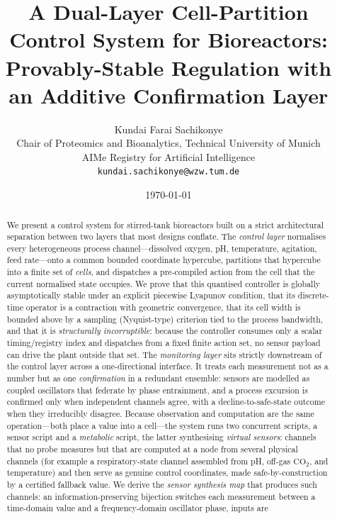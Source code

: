 \documentclass[11pt,a4paper,twocolumn]{article}
\title{\textbf{A Dual-Layer Cell-Partition Control System for
Bioreactors:\\[2pt] Provably-Stable Regulation with an Additive
Confirmation Layer}}
\author{%
Kundai Farai Sachikonye\\
\small Chair of Proteomics and Bioanalytics, Technical University of Munich\\
\small AIMe Registry for Artificial Intelligence\\
\small \texttt{kundai.sachikonye@wzw.tum.de}}
\date{\today}
\theoremstyle{thmstyle}
\theoremstyle{definition}
\theoremstyle{remark}
\begin{document}
\maketitle

\begin{abstract}
\noindent
We present a control system for stirred-tank bioreactors built on a
strict architectural separation between two layers that most designs
conflate. The \emph{control layer} normalises every heterogeneous
process channel---dissolved oxygen, pH, temperature, agitation, feed
rate---onto a common bounded coordinate hypercube, partitions that
hypercube into a finite set of \emph{cells}, and dispatches a
pre-compiled action from the cell that the current normalised state
occupies. We prove that this quantised controller is globally
asymptotically stable under an explicit piecewise Lyapunov condition,
that its discrete-time operator is a contraction with geometric
convergence, that its cell width is bounded above by a sampling
(Nyquist-type) criterion tied to the process bandwidth, and that it is
\emph{structurally incorruptible}: because the controller consumes only
a scalar timing/registry index and dispatches from a fixed finite action
set, no sensor payload can drive the plant outside that set. The
\emph{monitoring layer} sits strictly downstream of the control layer
across a one-directional interface. It treats each measurement not as a
number but as one \emph{confirmation} in a redundant ensemble: sensors
are modelled as coupled oscillators that federate by phase entrainment,
and a process excursion is confirmed only when independent channels
agree, with a decline-to-safe-state outcome when they irreducibly
disagree. Because observation and computation are the same
operation---both place a value into a cell---the system runs two
concurrent scripts, a sensor script and a \emph{metabolic} script, the
latter synthesising \emph{virtual sensors}: channels that no probe
measures but that are computed at a node from several physical channels
(for example a respiratory-state channel assembled from pH, off-gas
$\mathrm{CO_2}$, and temperature) and then serve as genuine control
coordinates, made safe-by-construction by a certified fallback value. We
derive the \emph{sensor synthesis map} that produces such channels: an
information-preserving bijection switches each measurement between a
time-domain value and a frequency-domain oscillator phase, inputs are

\end{abstract}
\end{document}
